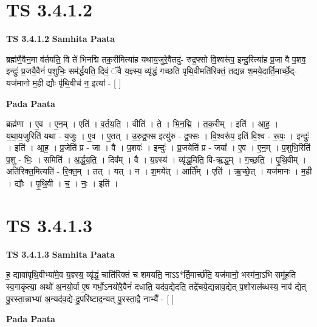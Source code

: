\documentclass[17pt]{extarticle}
\begin{document}
\section{ TS 3.4.1.2 }

\textbf{TS 3.4.1.2 } \newline
\textbf{Samhita Paata} \newline

ब्रह्म॑णै॒वैन॒मा व॑र्तयति॒ वि ते॑ भिनद्मि तक॒रीमित्या॑ह यथाय॒जुरे॒वैतदु॑- रुद्र॒फ्सो वि॒श्वरू॑प॒ इन्दु॒रित्या॑ह प्र॒जा वै प॒शव॒ इन्दुः॑ प्र॒जयै॒वैनं॑ प॒शुभिः॒ सम॑र्द्धयति॒ दिवं॒ ॅवै य॒ज्ञ्स्य॒ व्यृ॑द्धं गच्छति पृथि॒वीमति॑रिक्तं॒ तद्यन्न श॒मये॒दार्ति॒मार्च्छे॒द्-यज॑मानो म॒ही द्यौः पृ॑थि॒वीच॑ न॒ इत्या॑ - [  ] \newline

\textbf{Pada Paata} \newline

ब्रह्म॑णा । ए॒व । ए॒न॒म् । एति॑ । व॒र्त॒य॒ति॒ । वीति॑ । ते॒ । भि॒न॒द्मि॒ । त॒क॒रीम् । इति॑ । आ॒ह॒ । य॒था॒य॒जुरिति॑ यथा - य॒जुः । ए॒व । ए॒तत् । उ॒रु॒द्र॒फ्स इत्यु॑रु - द्र॒फ्सः । वि॒श्वरू॑प॒ इति॑ वि॒श्व - रू॒पः॒ । इन्दुः॑ । इति॑ । आ॒ह॒ । प्र॒जेति॑ प्र - जा । वै । प॒शवः॑ । इन्दुः॑ । प्र॒जयेति॑ प्र - जया᳚ । ए॒व । ए॒न॒म् । प॒शुभि॒रिति॑ प॒शु - भिः॒ । समिति॑ । अ॒र्द्ध॒य॒ति॒ । दिव᳚म् । वै । य॒ज्ञ्स्य॑ । व्यृ॑द्ध॒मिति॒ वि-ऋ॒द्ध॒म् । ग॒च्छ॒ति॒ । पृ॒थि॒वीम् । अति॑रिक्त॒मित्यति॑ - रि॒क्त॒म् । तत् । यत् । न । श॒मये᳚त् । आर्ति᳚म् । एति॑ । ऋ॒च्छे॒त् । यज॑मानः । म॒ही । द्यौः । पृ॒थि॒वी । च॒ । नः॒ । इति॑ ।  \newline





\section{ TS 3.4.1.3 }

\textbf{TS 3.4.1.3 } \newline
\textbf{Samhita Paata} \newline

ह॒ द्यावा॑पृथि॒वीभ्या॑मे॒व य॒ज्ञ्स्य॒ व्यृ॑द्धं॒ चाति॑रिक्तं च शमयति॒ नाऽऽ*र्ति॒मार्च्छ॑ति॒ यज॑मानो॒ भस्म॑ना॒ऽभि समू॑हति स्व॒गाकृ॑त्या॒ अथो॑ अ॒नयो॒र्वा ए॒ष गर्भो॒ऽनयो॑रे॒वैनं॑ दधाति॒ यद॑व॒द्येदति॒ तद्रे॑चये॒द्यन्नाव॒द्येत् प॒शोराल॑ब्धस्य॒ नाव॑ द्येत् पु॒रस्ता॒न्नाभ्या॑ अ॒न्यद॑व॒द्ये-दु॒परि॑ष्टाद॒न्यत् पु॒रस्ता॒द्वै नाभ्यै᳚ - [  ] \newline

\textbf{Pada Paata} \newline
\end{document}
